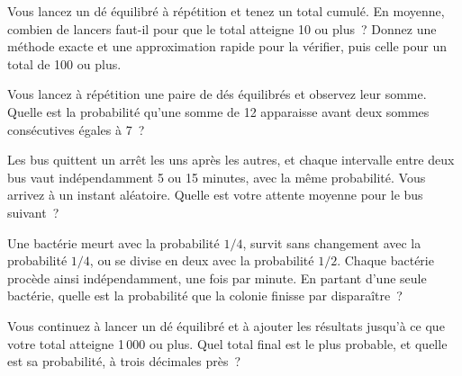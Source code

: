 \begin{question}\label{iq:iv1:waiting-times-and-markov-chains:10}
Vous lancez un dé équilibré à répétition et tenez un total cumulé. En moyenne, combien de lancers faut-il pour que le total atteigne 10 ou plus~? Donnez une méthode exacte et une approximation rapide
pour la vérifier, puis celle pour un total de 100 ou plus.
\end{question}

\begin{question}\label{iq:iv1:waiting-times-and-markov-chains:11}
Vous lancez à répétition une paire de dés équilibrés et observez leur somme. Quelle est la probabilité qu'une somme de 12 apparaisse avant deux sommes consécutives égales à 7~?
\end{question}

\begin{question}\label{iq:iv1:waiting-times-and-markov-chains:12}
Les bus quittent un arrêt les uns après les autres, et chaque intervalle entre deux bus vaut indépendamment 5 ou 15 minutes, avec la même probabilité. Vous arrivez à un instant aléatoire. Quelle est votre attente moyenne pour le bus suivant~?
\end{question}

\begin{question}\label{iq:iv1:waiting-times-and-markov-chains:13}
Une bactérie meurt avec la probabilité $1/4$, survit sans changement avec la probabilité $1/4$, ou se divise en deux avec la probabilité $1/2$. Chaque bactérie procède ainsi indépendamment, une fois par minute. En partant d'une seule bactérie, quelle est la probabilité que la colonie finisse par disparaître~?
\end{question}

\begin{question}\label{iq:iv1:waiting-times-and-markov-chains:14}
Vous continuez à lancer un dé équilibré et à ajouter les résultats jusqu'à ce que votre total atteigne 1\,000 ou plus. Quel total final est le plus probable, et quelle est sa probabilité, à trois décimales près~?
\end{question}

